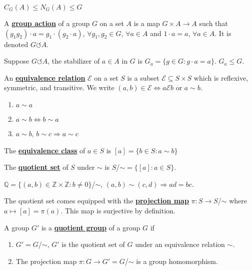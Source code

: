 \documentclass[11pt,letterpaper]{book}
\newcommand{\define}[1]{\underline{\textbf{#1}}}
\newcommand{\pn}[1]{\left( #1 \right)}
\newcommand{\hmap}[3][\varphi]{%
    #1:#2\rightarrow#3}
\theoremstyle{definition}
\begin{document}
\begin{prop}
    $C_G(A)\le N_G(A)\le G$
\end{prop}

\begin{defi}
    A \define{group action} of a group $G$ on a set $A$ is a map $G\times A\rightarrow A$ such that $(g_1g_2)\cdot a=g_1\cdot\pn{g_2\cdot a}$, $\forall g_1,g_2\in G$, $\forall a\in A$ and $1\cdot a=a$, $\forall a\in A$. It is denoted $G\circlearrowleft A$.
\end{defi}

\begin{defi}
    Suppose $G\circlearrowleft A$, the stabilizer of $a\in A$ in $G$ is $G_a=\{g\in G:g\cdot a=a\}$. $G_a\le G$.
\end{defi}

\begin{bdefi}
    An \define{equivalence relation} $\mathcal{E}$ on a set $S$ is a subset $\mathcal{E}\subseteq S\times S$ which is reflexive, symmetric, and transitive. We write $(a,b)\in\mathcal{E}\Leftrightarrow a\mathrel\mathcal{E}b$ or $a\sim b$.
    \begin{enumerate}
        \item $a\sim a$
        \item $a\sim b\Leftrightarrow b\sim a$
        \item $a\sim b$, $b\sim c\Rightarrow a\sim c$
    \end{enumerate}
\end{bdefi}

\begin{defi}
    The \define{equivalence class} of $a\in S$ is $[a]=\{b\in S:a\sim b\}$
\end{defi}

\begin{defi}
    The \define{quotient set} of $S$ under $\sim$ is $S$/$\sim=\{[a]:a\in S\}$.
\end{defi}

\begin{ex}
    $\mathbb{Q}=\{(a,b)\in\mathbb{Z}\times\mathbb{Z}:b\ne 0\}$/$\sim$, $(a,b)\sim(c,d)\Rightarrow ad=bc$.
\end{ex}

\begin{defi}
    The quotient set comes equipped with the \define{projection map} $\pi:S\rightarrow S$/$\sim$ where $a\mapsto[a]=\pi(a)$. This map is surjective by definition.
\end{defi}

\begin{bdefi}
    A group $G'$ is a \define{quotient group} of a group $G$ if
    \begin{enumerate}
        \item $G'=G$/$\sim$, $G'$ is the quotient set of $G$ under an equivalence relation $\sim$.
        \item The projection map $\hmap[\pi]{G}{G'}=G$/$\sim$ is a group homomorphism.
    \end{enumerate}
\end{bdefi}
\end{document}
